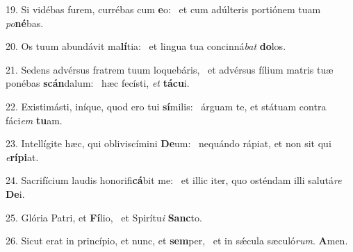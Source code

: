 19. Si vidébas furem, currébas cum \textbf{e}o: \ast\  et cum adúlteris portiónem tuam \textit{po}\textbf{né}bas.\

20. Os tuum abundávit ma\textbf{lí}tia: \ast\  et lingua tua concinná\textit{bat} \textbf{do}los.\

21. Sedens advérsus fratrem tuum loquebáris, \dag\  et advérsus fílium matris tuæ ponébas \textbf{scán}dalum: \ast\  hæc fecísti, \textit{et} \textbf{tá}\textbf{cu}i.\

22. Existimásti, iníque, quod ero tui \textbf{sí}milis: \ast\  árguam te, et státuam contra fáci\textit{em} \textbf{tu}am.\

23. Intellígite hæc, qui obliviscímini \textbf{De}um: \ast\  nequándo rápiat, et non sit qui \textit{e}\textbf{rí}\textbf{pi}at.\

24. Sacrifícium laudis honorifi\textbf{cá}bit me: \ast\  et illic iter, quo osténdam illi salutá\textit{re} \textbf{De}i.\

25. Glória Patri, et \textbf{Fí}lio, \ast\  et Spirítu\textit{i} \textbf{Sanc}to.\

26. Sicut erat in princípio, et nunc, et \textbf{sem}per, \ast\  et in sǽcula sæculó\textit{rum}. \textbf{A}men.\


